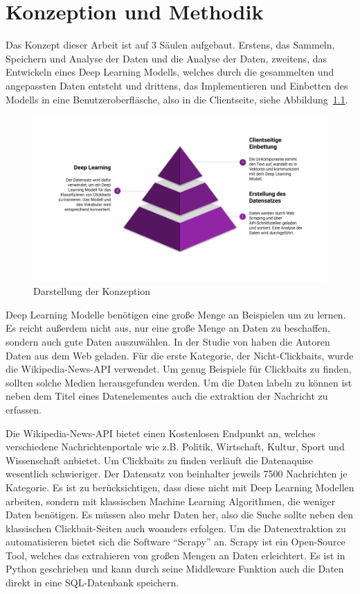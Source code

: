 \chapter{Konzeption und Methodik}


Das Konzept dieser Arbeit ist auf 3 Säulen aufgebaut. Erstens, das Sammeln, Speichern und Analyse der Daten und die Analyse der Daten, zweitens, das Entwickeln eines Deep Learning Modells, welches durch die gesammelten und angepassten Daten entsteht und drittens, das Implementieren und Einbetten des Modells in eine Benutzeroberfläsche, also in die Clientseite, siehe Abbildung~\ref{Kap5:Konzeption}.

\begin{figure}[H]
    \centering
    \includegraphics[width=15cm]{kapitel5/main_p.png}
    \caption[Darstellung der Konzeption]{Darstellung der Konzeption}
    \label{Kap5:Konzeption}
\end{figure}


Deep Learning Modelle benötigen eine große Menge an Beispielen um zu lernen. Es reicht außerdem nicht aus, nur eine große Menge an Daten zu beschaffen, sondern auch gute Daten auszuwählen. In der Studie von \cite*{Chakrabortya} haben die Autoren Daten aus dem Web geladen. Für die erste Kategorie, der Nicht-Clickbaits, wurde die Wikipedia-News-API verwendet. Um genug Beispiele für Clickbaits zu finden, sollten solche Medien herausgefunden werden. Um die Daten labeln zu können ist neben dem Titel eines Datenelementes auch die extraktion der Nachricht zu erfassen.

Die Wikipedia-News-API bietet einen Kostenlosen Endpunkt an, welches verschiedene Nachrichtenportale wie z.B. Politik, Wirtschaft, Kultur, Sport und Wissenschaft anbietet. Um Clickbaits zu finden verläuft die Datenaquise wesentlich schwieriger. Der Datensatz von \cite*{Chakrabortya} beinhalter jeweils 7500 Nachrichten je Kategorie. Es ist zu berücksichtigen, dass diese nicht mit Deep Learning Modellen arbeiten, sondern mit klassischen Machine Learning Algorithmen, die weniger Daten benötigen. Es müssen also mehr Daten her, also die Suche sollte neben den klassischen Clickbait-Seiten auch woanders erfolgen. Um die Datenextraktion zu automatisieren bietet sich die Software \enquote{Scrapy} an. Scrapy ist ein Open-Source Tool, welches das extrahieren von großen Mengen an Daten erleichtert. Es ist in Python geschrieben und kann durch seine Middleware Funktion auch die Daten direkt in eine SQL-Datenbank speichern.

